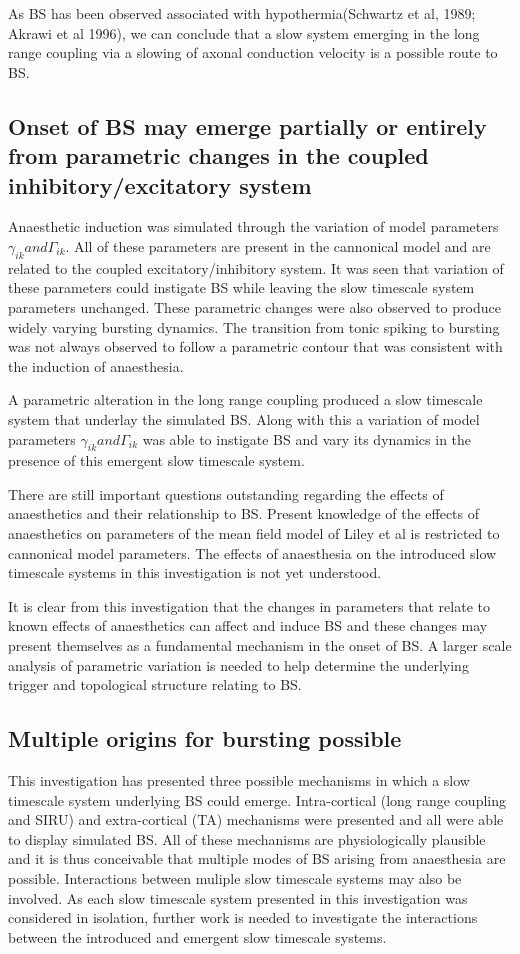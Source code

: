 \documentclass[a4paper,12pt]{article}
\begin{document}
As BS has been observed associated with hypothermia(Schwartz et al, 1989; Akrawi et al 1996), we can conclude that  a slow system emerging in the long range coupling via a slowing of axonal conduction velocity is a possible route
to BS.

\subsection{Onset of BS may emerge partially or entirely from parametric changes in the coupled inhibitory/excitatory system}
Anaesthetic induction was simulated through the variation of model parameters $\gamma_{ik} and \Gamma_{ik}$. All of these parameters are present in the cannonical model and are related to the coupled excitatory/inhibitory system. It was seen that variation of these parameters could instigate BS while leaving the slow timescale system parameters unchanged. These parametric changes were also observed to produce widely varying bursting dynamics. The transition from tonic spiking to bursting was not always observed to follow a parametric contour that was consistent with the induction of anaesthesia.

A parametric alteration in the long range coupling produced a slow timescale system that underlay the simulated BS. Along with this a variation of model parameters $\gamma_{ik} and \Gamma_{ik}$ was able to instigate BS and vary its dynamics in the presence of this emergent slow timescale system.

There are still important questions outstanding regarding the effects of anaesthetics and their relationship to BS. Present knowledge of the effects of anaesthetics on parameters of the mean field model of Liley et al is restricted to cannonical model parameters. The effects of anaesthesia on the introduced slow timescale systems in this investigation is not yet understood. 

It is clear from this investigation that the changes in parameters that relate to known effects of anaesthetics can affect and induce BS and these changes may present themselves as a fundamental mechanism in the onset of BS. A larger scale analysis of parametric variation is needed to help determine the underlying trigger and topological structure relating to BS.

\subsection{Multiple origins for bursting possible}
This investigation has presented three possible mechanisms in which a slow timescale system underlying BS could emerge. Intra-cortical (long range coupling and SIRU) and extra-cortical (TA) mechanisms were presented and all were able to display simulated BS. All of these mechanisms are physiologically plausible and it is thus conceivable that multiple modes of BS arising from anaesthesia are possible. Interactions between muliple slow timescale systems may also be involved. As each slow timescale system presented in this investigation was considered in isolation, further work is needed to investigate the interactions between the introduced and emergent slow timescale systems.
\end{document}
